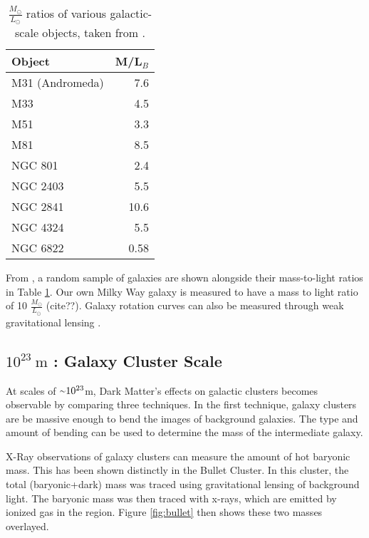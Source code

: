     \begin{table}[]
      \centering
      \caption{$\frac{M_\odot}{L_\odot}$ ratios of various galactic-scale objects, taken from \cite{faber_ml}.}
      \label{tab:mlratios}
      \begin{tabular}{l r}
        Object          & M/L${}_{B}$ \\
        \hline
        M31 (Andromeda) &  7.6  \\
        M33             &  4.5  \\
        M51             &  3.3  \\
        M81             &  8.5  \\
        NGC 801         &  2.4  \\
        NGC 2403        &  5.5  \\
        NGC 2841        & 10.6  \\
        NGC 4324        &  5.5  \\
        NGC 6822        &  0.58 \\
      \end{tabular}
    \end{table}
      
    From \cite{faber_ml}, a random sample of galaxies are shown alongside their mass-to-light ratios in Table \ref{tab:mlratios}.
    Our own Milky Way galaxy is measured to have a mass to light ratio of 10 $\frac{M_{\odot}}{L_{\odot}}$ {\color{red}(cite??)}.
    Galaxy rotation curves can also be measured through weak gravitational lensing \cite{weak_lensing_2001}.

  \subsection{$10^{23}\:\text{m}$ : Galaxy Cluster Scale}
    At scales of $\nicetilde 10^{23}$m, Dark Matter's effects on galactic clusters becomes observable by comparing three techniques.
    In the first technique, galaxy clusters are be massive enough to bend the images of background galaxies.
    The type and amount of bending can be used to determine the mass of the intermediate galaxy.

    X-Ray observations of galaxy clusters can measure the amount of hot baryonic mass.
    This has been shown distinctly in the Bullet Cluster\cite{bullet_cluster}.
    In this cluster, the total (baryonic+dark) mass was traced using gravitational lensing of background light.
    The baryonic mass was then traced with x-rays, which are emitted by ionized gas in the region.
    Figure \ref{fig:bullet} then shows these two masses overlayed.


